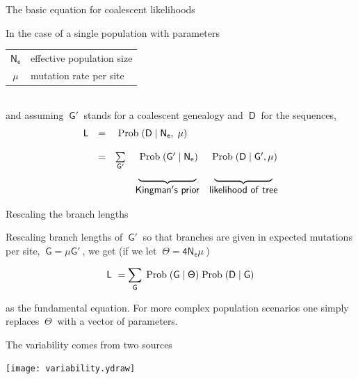 \documentclass[bluish,slideColor,colorBG,pdf]{prosper}
\def\prob{{\rm \;Prob\;}}
\begin{document}
\begin{slide}[Replace]{The basic equation for coalescent likelihoods}

In the case of a single population with parameters\\
\begin{tabular}{c l}
$\mathsf{N_e}$ & effective population size \\
$\mathsf{\mu}$ & mutation rate per site
\end{tabular}\\
and assuming $~\mathsf{G'}~$ stands for a coalescent genealogy and $~\mathsf{D}~$ for the
sequences,
{
\[
\begin{array}{c c c c c}
\mathsf{L} & \mathsf{=}  & \multicolumn{2}{l}{\mathsf{\prob(D\;|\;N_e,\;\mu)}} &\\
& & & & \\
 & \mathsf{=}  & \mathsf{\sum\limits_{G '}} & \mathsf{\prob(G'\;|\;N_e)} & \mathsf{\prob(D\;|\;G', \mu)} \\
 &    &                   & \underbrace{~~~~~~~~~~~~~~~~~~} & \underbrace{~~~~~~~~~~~~~~~~~~} \\
 & & & {\sf Kingman's~prior} & {\sf likelihood~of~tree}
\end{array}
\]
}


\end{slide}

\begin{slide}[Replace]{Rescaling the branch lengths}
\bigskip

Rescaling branch lengths of $~\mathsf{G'}~$ so that branches are given in expected
mutations per site, $~\mathsf{G = \mu G'}~$, we get (if we let $~\mathsf{\Theta
= 4N_e\mu}~$)
\bigskip

\[
\mathsf{L \ = \sum_G \prob(G\;|\;\Theta) \prob(D\;|\;G)}
\]
\bigskip

\noindent
as the fundamental equation.  For more complex population scenarios one
simply replaces $~\mathsf{\Theta}~$ with a vector of parameters.
\bigskip

\end{slide}

\begin{slide}[Replace]{The variability comes from two sources}

\vspace{-0.2in}

\centerline{\texttt{[image: variability.ydraw]}}

\end{slide}
\end{document}
